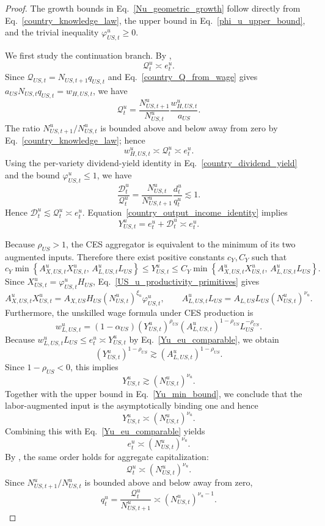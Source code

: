 \documentclass{article}
\begin{document}
\begin{proof}
The growth bounds in Eq.~\eqref{Nu_geometric_growth} follow directly from Eq.~\eqref{country_knowledge_law}, the upper bound in Eq.~\eqref{phi_u_upper_bound}, and the trivial inequality $\varphi_{US,t}^u\ge 0$.

We first study the continuation branch. By ,
\[
\mathcal Q_t^u\asymp e_t^u.
\]
Since $\mathcal Q_{US,t}=N_{US,t+1}q_{US,t}$ and Eq.~\eqref{country_Q_from_wage} gives $a_{US}N_{US,t}q_{US,t}=w_{H,US,t}$, we have
\[
\mathcal Q_t^u
=
\frac{N_{US,t+1}^u}{N_{US,t}^u}\frac{w_{H,US,t}^u}{a_{US}}.
\]
The ratio $N_{US,t+1}^u/N_{US,t}^u$ is bounded above and below away from zero by Eq.~\eqref{country_knowledge_law}; hence
\[
w_{H,US,t}^u\asymp \mathcal Q_t^u\asymp e_t^u.
\]
Using the per-variety dividend-yield identity in Eq.~\eqref{country_dividend_yield} and the bound $\varphi_{US,t}^u\le 1$, we have
\[
\frac{\mathcal D_t^u}{\mathcal Q_t^u}
=
\frac{N_{US,t}^u}{N_{US,t+1}^u}\frac{d_t^u}{q_t^u}
\lesssim 1.
\]
Hence $\mathcal D_t^u\lesssim \mathcal Q_t^u\asymp e_t^u$. Equation~\eqref{country_output_income_identity} implies
\begin{equation}\label{Yu_eu_comparable}
Y_{US,t}^u=e_t^u+\mathcal D_t^u\asymp e_t^u.
\end{equation}

Because $\rho_{US}>1$, the CES aggregator is equivalent to the minimum of its two augmented inputs. Therefore there exist positive constants $c_Y,C_Y$ such that
\begin{equation}\label{Yu_min_bound}
c_Y\min\!\left\{A_{X,US,t}^uX_{US,t}^u,\,A_{L,US,t}^uL_{US}\right\}
\le
Y_{US,t}^u
\le
C_Y\min\!\left\{A_{X,US,t}^uX_{US,t}^u,\,A_{L,US,t}^uL_{US}\right\}.
\end{equation}
Since $X_{US,t}^u=\varphi_{US,t}^uH_{US}$, Eq.~\eqref{US_u_productivity_primitives} gives
\[
A_{X,US,t}^uX_{US,t}^u=A_{X,US}H_{US}(N_{US,t}^u)^{\xi_u}\varphi_{US,t}^u,
\qquad
A_{L,US,t}^uL_{US}=A_{L,US}L_{US}(N_{US,t}^u)^{\nu_u}.
\]
Furthermore, the unskilled wage formula under CES production is
\[
w_{L,US,t}^u
=(1-\alpha_{US})(Y_{US,t}^u)^{\rho_{US}}(A_{L,US,t}^u)^{1-\rho_{US}}L_{US}^{-\rho_{US}}.
\]
Because $w_{L,US,t}^uL_{US}\le e_t^u\asymp Y_{US,t}^u$ by Eq.~\eqref{Yu_eu_comparable}, we obtain
\[
(Y_{US,t}^u)^{1-\rho_{US}}\gtrsim (A_{L,US,t}^u)^{1-\rho_{US}}.
\]
Since $1-\rho_{US}<0$, this implies
\[
Y_{US,t}^u\gtrsim (N_{US,t}^u)^{\nu_u}.
\]
Together with the upper bound in Eq.~\eqref{Yu_min_bound}, we conclude that the labor-augmented input is the asymptotically binding one and hence
\[
Y_{US,t}^u\asymp (N_{US,t}^u)^{\nu_u}.
\]
Combining this with Eq.~\eqref{Yu_eu_comparable} yields
\[
e_t^u\asymp (N_{US,t}^u)^{\nu_u}.
\]
By , the same order holds for aggregate capitalization:
\[
\mathcal Q_t^u\asymp (N_{US,t}^u)^{\nu_u}.
\]
Since $N_{US,t+1}^u/N_{US,t}^u$ is bounded above and below away from zero,
\[
q_t^u=\frac{\mathcal Q_t^u}{N_{US,t+1}^u}\asymp (N_{US,t}^u)^{\nu_u-1}.
\]


\end{proof}
\end{document}
